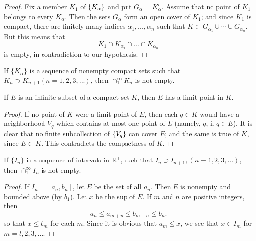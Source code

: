 \begin{proof}
    Fix a member $K_1$ of $\protect\{K_\alpha\}$ and put $G_\alpha = K^c_\alpha$. 
    Assume that no point of $K_1$ belongs to every $K_\alpha$. 
    Then the sets $G_\alpha$ form an open cover of $K_1$; 
    and since $K_1$ is compact, there are finitely many indices $\alpha_1, ..., \alpha_n$ such that $K \subset G_{\alpha_1} \cup \cdots \cup G_{\alpha_n}$. 
    But this means that
\begin{equation*}
    K_1 \cap
    K_{\alpha_1} \cap
    \dots \cap
    K_{\alpha_n}
\end{equation*}
is empty, in contradiction to our hypothesis.
\end{proof}

\begin{myCorollary*}
    If $\{K_\alpha\}$ is a sequence of nonempty compact sets such that $K_n \supset K_{n+1} (n=1,2,3,...)$, then $\cap_1^\infty K_n$ is not empty.
\end{myCorollary*}

\begin{thm}
    \label{thm:2.37}
    If $E$ is an infinite subset of a compact set $K$, 
    then $E$ has a limit point in $K$.
\end{thm}

\begin{proof}
    If no point of $K$ were a limit point of $E$, 
    then each $q \in K$ would have a neighborhood $V_q$ which contains at most one point of $E$ (namely, $q$, if $q \in E$). 
    It is clear that no finite subcollection of $\protect\{V_q\}$ can cover $E$;
    and the same is true of $K$, since $E \subset K$. This contradicts the compactness of $K$.
\end{proof}

\begin{thm}
    \label{thm:2.38}
    If $\{I_n\}$ is a sequence of intervals in ${\protect\mathbb R}^1$, 
    such that $I_n \supset I_{n+1}, (n=1,2,3,...)$, 
    then $\cap_1^\infty I_n$ is not empty.
\end{thm}

\begin{proof}
    If $I_n = [a_n, b_n]$, let $E$ be the set of all $a_n$. 
    Then $E$ is nonempty and bounded above (by $b_1$). 
    Let $x$ be the sup of $E$. 
    If $m$ and $n$ are positive integers, then
    \begin{equation*}
        a_{n} \leq
        a_{m+n} \leq
        b_{m+n} \leq
        b_{n} .
    \end{equation*}
    so that $x \leq b_m$ for each $m$. 
    Since it is obvious that $a_m \leq x$, 
    we see that $x \in I_m$ for $m = l, 2, 3, ...$.
\end{proof}

